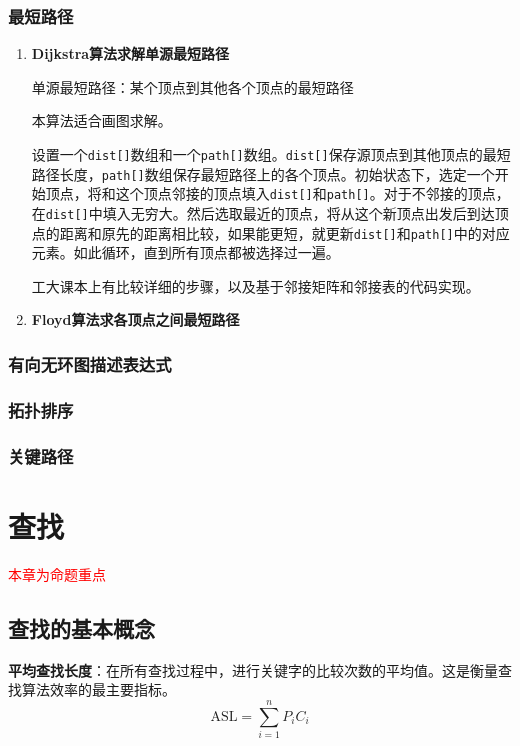 \documentclass[12pt, a4paper, oneside]{ctexart}
\begin{document}
\subsubsection{最短路径}

\begin{enumerate}
  \item {\bf Dijkstra算法求解单源最短路径}
  
  单源最短路径：某个顶点到其他各个顶点的最短路径

  本算法适合画图求解。

  设置一个\verb|dist[]|数组和一个\verb|path[]|数组。\verb|dist[]|保存源顶点到其他顶点的最短路径长度，\verb|path[]|数组保存最短路径上的各个顶点。初始状态下，选定一个开始顶点，将和这个顶点邻接的顶点填入\verb|dist[]|和\verb|path[]|。对于不邻接的顶点，在\verb|dist[]|中填入无穷大。然后选取最近的顶点，将从这个新顶点出发后到达顶点的距离和原先的距离相比较，如果能更短，就更新\verb|dist[]|和\verb|path[]|中的对应元素。如此循环，直到所有顶点都被选择过一遍。

  工大课本上有比较详细的步骤，以及基于邻接矩阵和邻接表的代码实现。

  \item {\bf Floyd算法求各顶点之间最短路径}
  
  
\end{enumerate}

\subsubsection{有向无环图描述表达式}

\subsubsection{拓扑排序}

\subsubsection{关键路径}

\section{查找}

\textcolor{red}{本章为命题重点}

\subsection{查找的基本概念}

\textbf{平均查找长度}：在所有查找过程中，进行关键字的比较次数的平均值。这是衡量查找算法效率的最主要指标。
\begin{equation*}
  \text{ASL}=\sum_{i=1}^{n}P_i C_i
\end{equation*}
\end{document}
